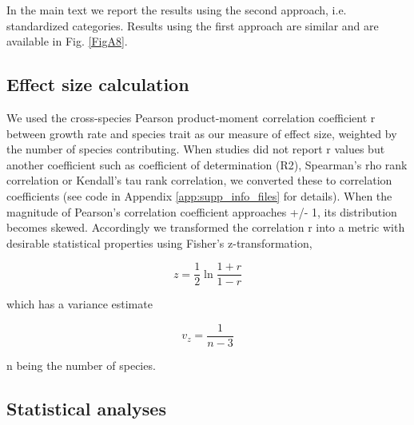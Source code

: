 \documentclass[a4paper]{article}\usepackage[]{graphicx}\usepackage[]{color}
\begin{document}
In the main text we report the results using the second approach, i.e. standardized categories. Results using the first approach are similar and are available in Fig. \ref{FigA8}.

\subsection*{Effect size calculation}\label{effect-size-calculation}

We used the cross-species Pearson product-moment correlation coefficient r between growth rate and species trait as our measure of effect size, weighted by the number of species contributing. When studies did not report r values but another coefficient such as coefficient of determination (R2), Spearman's rho rank correlation or Kendall's tau rank correlation, we converted these to correlation coefficients  \citep{Lajeunesse:2013tm} (see code in Appendix \ref{app:supp_info_files} for details). When the magnitude of Pearson's correlation coefficient approaches +/- 1, its distribution becomes skewed. Accordingly we transformed the correlation r into a metric with desirable statistical properties using Fisher's z-transformation,

\[ z = \frac{1}{2} \ln \frac{1+r}{1-r} \]

which has a variance estimate

\[ v_z= \frac{1}{n-3} \]

n being the number of species.

\subsection*{Statistical analyses}\label{statistical-analyses}
\end{document}
